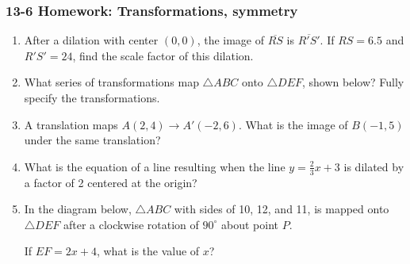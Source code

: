 \documentclass[12pt, twoside]{article}
\begin{document}
\subsubsection*{13-6 Homework: Transformations, symmetry}
 \begin{enumerate}


  \item After a dilation with center $(0,0)$, the image of $\overline{RS}$ is $\overline{R'S'}$. If $RS=6.5$ and $R'S'=24$, find the scale factor of this dilation. \vspace{2.5cm}

  \item What series of transformations map $\triangle ABC$ onto $\triangle DEF$, shown below? Fully specify the transformations.
    \begin{center}
    \end{center}
      \vspace{2cm}

  \item A translation maps $A(2,4) \rightarrow A'(-2,6)$. What is the image of $B(-1,5)$ under the same translation?  \vspace{1.5cm}

  \item What is the equation of a line resulting when the line $y=\frac{2}{3}x+3$ is dilated by a factor of 2 centered at the origin?

\newpage
  \item In the diagram below, $\triangle ABC$ with sides of 10, 12, and 11, is mapped onto $\triangle DEF$ after a clockwise rotation of $90^\circ$ about point $P$.
      \begin{center}
      \end{center}
    If $EF=2x+4$, what is the value of $x$? \vspace{3.5cm}


\end{enumerate}
\end{document}
